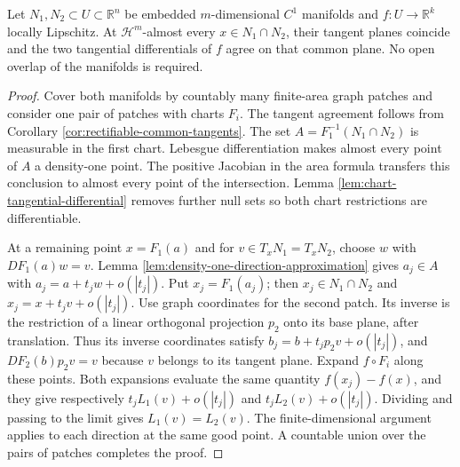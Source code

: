 \begin{proposition}\label{prop:overlap-tangential-differentials}
Let $N_1,N_2\subset U\subset\mathbb R^n$ be embedded $m$-dimensional $C^1$ manifolds and $f:U\to\mathbb R^k$ locally Lipschitz. At $\mathcal H^m$-almost every $x\in N_1\cap N_2$, their tangent planes coincide and the two tangential differentials of $f$ agree on that common plane. No open overlap of the manifolds is required.
\end{proposition}
\begin{proof}
Cover both manifolds by countably many finite-area graph patches and consider one pair of patches with charts $F_i$. The tangent agreement follows from Corollary \ref{cor:rectifiable-common-tangents}. The set $A=F_1^{-1}(N_1\cap N_2)$ is measurable in the first chart. Lebesgue differentiation makes almost every point of $A$ a density-one point. The positive Jacobian in the area formula transfers this conclusion to almost every point of the intersection. Lemma \ref{lem:chart-tangential-differential} removes further null sets so both chart restrictions are differentiable.

At a remaining point $x=F_1(a)$ and for $v\in T_xN_1=T_xN_2$, choose $w$ with $DF_1(a)w=v$. Lemma \ref{lem:density-one-direction-approximation} gives $a_j\in A$ with $a_j=a+t_jw+o(|t_j|)$. Put $x_j=F_1(a_j)$; then $x_j\in N_1\cap N_2$ and $x_j=x+t_jv+o(|t_j|)$. Use graph coordinates for the second patch. Its inverse is the restriction of a linear orthogonal projection $p_2$ onto its base plane, after translation. Thus its inverse coordinates satisfy $b_j=b+t_jp_2v+o(|t_j|)$, and $DF_2(b)p_2v=v$ because $v$ belongs to its tangent plane. Expand $f\circ F_i$ along these points. Both expansions evaluate the same quantity $f(x_j)-f(x)$, and they give respectively $t_jL_1(v)+o(|t_j|)$ and $t_jL_2(v)+o(|t_j|)$. Dividing and passing to the limit gives $L_1(v)=L_2(v)$. The finite-dimensional argument applies to each direction at the same good point. A countable union over the pairs of patches completes the proof.
\end{proof}

